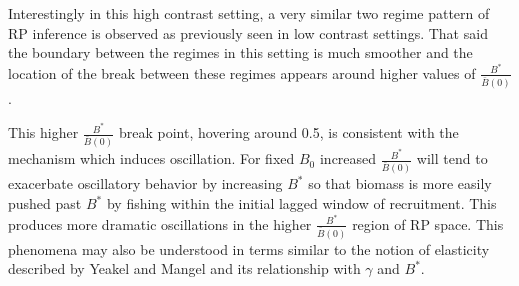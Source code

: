 %
Interestingly in this high contrast setting, a very similar two regime pattern
of RP inference is observed as previously seen in low contrast settings.
That said the boundary between the regimes in this setting is much smoother
and the location of the break between these regimes appears around higher values of
$\frac{B^*}{\bar B(0)}$. %


%
This higher $\frac{B^*}{\bar B(0)}$ break point, hovering around 0.5, is
consistent with the mechanism which induces oscillation. 
For fixed $B_0$ increased $\frac{B^*}{\bar B(0)}$ will tend to exacerbate oscillatory behavior 
by increasing $B^*$ so that biomass is more easily pushed past $B^*$ by fishing
within the initial lagged window of recruitment. This produces more dramatic 
oscillations in the higher $\frac{B^*}{\bar B(0)}$ region of RP space. This 
phenomena may also be understood in terms similar to the notion of elasticity 
described by Yeakel and Mangel \cite{yeakel_generalized_2015} and its relationship 
with $\gamma$ and $B^*$.

%

